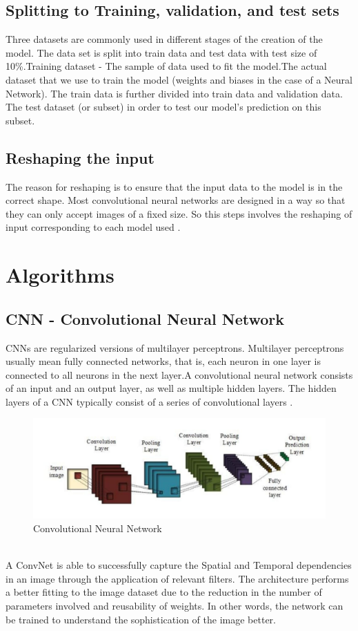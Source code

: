 \subsection{Splitting to Training, validation, and test sets}
Three datasets are commonly used in different stages of the creation of the model. The data set is split into train data  and test data with test size of 10\%.Training dataset - The sample of data used to fit the model.The actual dataset that we use to train the model (weights and biases in the case of a Neural Network). The train data is further divided into train data and validation data. The test dataset (or subset) in order to test our model’s prediction on this subset.
\subsection{Reshaping the input}
The reason for reshaping is to ensure that the input data to the model is in the correct shape. Most convolutional neural networks are designed in a way so that they can only accept images of a fixed size. So this steps involves the reshaping of input corresponding to each model used .

\section{Algorithms}
\subsection{CNN - Convolutional Neural Network}

CNNs are regularized versions of multilayer perceptrons. Multilayer perceptrons usually mean fully connected networks, that is, each neuron in one layer is connected to all neurons in the next layer.A convolutional neural network consists of an input and an output layer, as well as multiple hidden layers. The hidden layers of a CNN typically consist of a series of convolutional layers .\\
\begin{figure}[h]
\label{ss}
\centering
\includegraphics[width= 14 cm]{CNN.jpeg}
\caption{Convolutional Neural Network}
\end{figure}
\\A ConvNet is able to successfully capture the Spatial and Temporal dependencies in an image through the application of relevant filters. The architecture performs a better fitting to the image dataset due to the reduction in the number of parameters involved and reusability of weights. In other words, the network can be trained to understand the sophistication of the image better.

